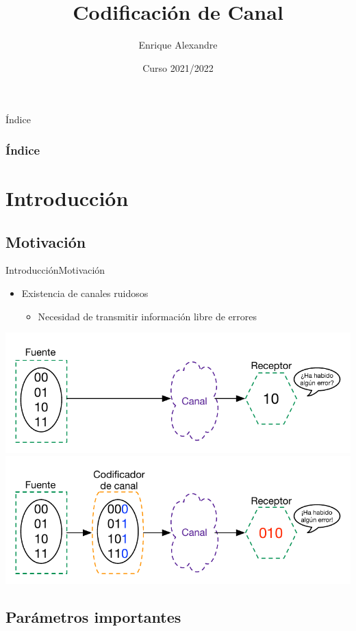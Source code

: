 \documentclass[10pt,compress]{beamer} %
\title[Codificación de Canal]{Codificación de Canal}
\author{Enrique Alexandre}
\institute{Dpto. de Teoría de la Señal y Comunicaciones}
\date{Curso 2021/2022}
\begin{document}
{\titlepageBlue
    \begin{frame}
        \titlepage
    \end{frame}
}

{
\begin{frame}[shrink]{Índice}
 \frametitle{Índice}
 \tableofcontents
\end{frame}
}

\section{Introducción}

\subsection{Motivación}

\begin{frame}{Introducción}{Motivación}
    \begin{itemize}
		\item Existencia de canales ruidosos
		\begin{itemize}
			\item Necesidad de transmitir información libre de errores
		\end{itemize}
	\end{itemize}
	\centering \includegraphics[width=0.7\linewidth]{../Apuntes/Figuras/CodificacionDeCanal1.pdf}
	\centering \includegraphics[width=0.7\linewidth]{../Apuntes/Figuras/CodificacionDeCanal2.pdf}
\end{frame}

\subsection{Parámetros importantes}
\end{document}
